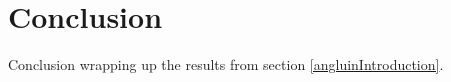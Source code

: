 \section{Conclusion} 

Conclusion wrapping up the results from section \ref{angluinIntroduction}. 
\clearpage
